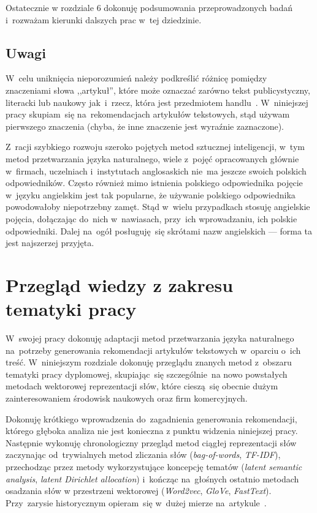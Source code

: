 \documentclass[pl]{minipw} %
\begin{document}
Ostatecznie w rozdziale 6 dokonuję podsumowania przeprowadzonych badań i~rozważam kierunki dalszych prac w~tej dziedzinie.

\section{Uwagi}
W~celu uniknięcia nieporozumień należy podkreślić różnicę pomiędzy znaczeniami słowa ,,artykuł'', które może oznaczać zarówno tekst publicystyczny, literacki lub naukowy jak~i~rzecz, która jest przedmiotem handlu~\cite{slownik}. W~niniejszej pracy skupiam~się na~rekomendacjach artykułów tekstowych, stąd używam pierwszego znaczenia (chyba, że inne znaczenie jest wyraźnie zaznaczone).

Z~racji szybkiego rozwoju szeroko pojętych metod sztucznej inteligencji, w~tym metod przetwarzania języka naturalnego, wiele z~pojęć opracowanych głównie w~firmach, uczelniach i~instytutach anglosaskich nie~ma jeszcze swoich polskich odpowiedników. Często również mimo istnienia polskiego odpowiednika pojęcie w~języku angielskim jest tak popularne, że używanie polskiego odpowiednika powodowałoby niepotrzebny zamęt. Stąd w~wielu przypadkach stosuję angielskie pojęcia, dołączając do~nich w~nawiasach, przy~ich wprowadzaniu, ich polskie odpowiedniki. Dalej na~ogół posługuję~się skrótami nazw angielskich --- forma ta jest najszerzej przyjęta. 

\chapter{Przegląd wiedzy z zakresu tematyki pracy}
W~swojej pracy dokonuję adaptacji metod przetwarzania języka naturalnego na~potrzeby generowania rekomendacji artykułów tekstowych w~oparciu o~ich treść. W~niniejszym rozdziale dokonuję przeglądu znanych metod z~obszaru tematyki pracy dyplomowej, skupiając~się szczególnie~na nowo powstałych metodach wektorowej reprezentacji słów, które cieszą~się obecnie dużym zainteresowaniem środowisk naukowych oraz firm komercyjnych. 

Dokonuję krótkiego wprowadzenia do~zagadnienia generowania rekomendacji, którego głęboka analiza nie jest konieczna z punktu widzenia niniejszej pracy. Następnie wykonuję chronologiczny przegląd metod ciągłej reprezentacji słów zaczynając od~trywialnych metod zliczania słów (\textit{bag-of-words}, \textit{TF-IDF}), przechodząc przez metody wykorzystujące koncepcję tematów (\textit{latent semantic analysis}, \textit{latent Dirichlet allocation}) i~kończąc na~głośnych ostatnio metodach osadzania słów w przestrzeni wektorowej (\textit{Word2vec}, \textit{GloVe}, \textit{FastText}). Przy~zarysie historycznym opieram~się w~dużej mierze na~artykule~\cite{aylien}.
\end{document}
